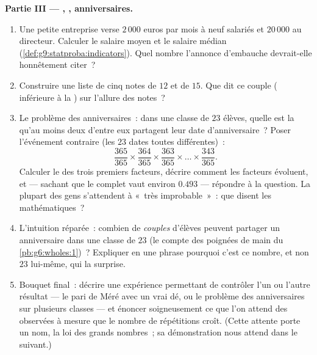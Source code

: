 \begin{problem}
\medskip
\noindent\textbf{Partie III --- , , anniversaires.}
\begin{enumerate}[resume]
  \item Une petite entreprise verse $2\,000$ euros par mois à neuf
        salariés et $20\,000$ au directeur. Calculer le salaire
        moyen et le salaire médian
        (\cref{def:g9:statproba:indicators}). Quel nombre l'annonce
        d'embauche devrait-elle honnêtement citer~?
  \item Construire une liste de cinq notes de  $12$ et de
         $15$. Que dit ce couple ( inférieure à la
        ) sur l'allure des notes~?
  \item Le problème des anniversaires~: dans une classe de $23$
        élèves, quelle est la  qu'au moins deux d'entre
        eux partagent leur date d'anniversaire~? Poser l'événement
        contraire (les $23$ dates toutes différentes)~:
        \[
        \frac{365}{365} \times \frac{364}{365} \times
        \frac{363}{365} \times \dots \times \frac{343}{365} .
        \]
        Calculer le  des trois premiers facteurs, décrire
        comment les facteurs évoluent, et --- sachant que le 
        complet vaut environ $0.493$ --- répondre à la question. La
        plupart des gens s'attendent à «~très improbable~»~: que
        disent les mathématiques~?
  \item L'intuition réparée~: combien de \emph{couples} d'élèves
        peuvent partager un anniversaire dans une classe de $23$
        (le compte des poignées de main du
        \cref{pb:g6:wholes:1})~? Expliquer en une phrase pourquoi
        c'est ce nombre, et non $23$ lui-même, qui  la
        surprise.
  \item Bouquet final~: décrire une expérience permettant de
        contrôler l'un ou l'autre résultat --- le pari de Méré avec
        un vrai dé, ou le problème des anniversaires sur plusieurs
        classes --- et énoncer soigneusement ce que l'on attend des
         observées à mesure que le nombre de répétitions
        croît. (Cette attente porte un nom, la loi des grands
        nombres~; sa démonstration nous attend dans le 
        suivant.)
\end{enumerate}
\end{problem}

